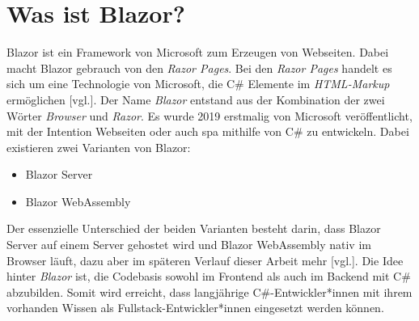 \section{Was ist Blazor?}
\label{subsec:wasIstBlazor}
Blazor ist ein Framework von Microsoft zum Erzeugen von Webseiten. Dabei macht Blazor gebrauch
von den \emph{Razor Pages}. Bei den \emph{Razor Pages} handelt es sich um eine Technologie von
Microsoft, die C\# Elemente im \emph{HTML-Markup} ermöglichen \cite{RazorPages}[vgl.].
Der Name \emph{Blazor} entstand aus der Kombination der zwei Wörter \emph{Browser} und
\emph{Razor}. Es wurde 2019 erstmalig von Microsoft
veröffentlicht, mit der Intention Webseiten oder auch \ac{spa} mithilfe von C\# zu entwickeln.
Dabei existieren zwei Varianten von Blazor:

\begin{itemize}
    \item Blazor Server
    \item Blazor WebAssembly
\end{itemize}
Der essenzielle Unterschied der beiden Varianten besteht darin, dass Blazor Server auf einem
Server gehostet wird und Blazor WebAssembly nativ im Browser läuft, dazu aber im späteren
Verlauf dieser Arbeit mehr \cite{WasIstBlazor}[vgl.].
\newline
\newline
Die Idee hinter \emph{Blazor} ist, die Codebasis sowohl im Frontend als auch im Backend mit
C\# abzubilden. Somit wird erreicht, dass langjährige C\#-Entwickler*innen mit ihrem vorhanden
Wissen als Fullstack-Entwickler*innen eingesetzt werden können.
